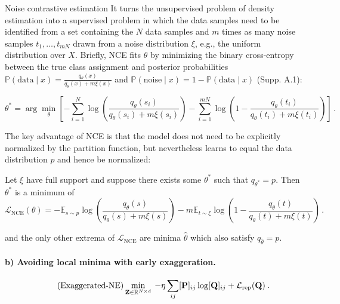 \begin{mem1}{Noise contrastive estimation}
    It turns the unsupervised problem of density estimation into a supervised problem in which the data samples need to be identified from a set containing the $N$ data samples and $m$ times as many noise samples $t_1, \dots, t_{mN}$ drawn from a noise distribution $\xi$, e.g., the uniform distribution over $X$. Briefly, NCE fits $\theta$ by minimizing the binary cross-entropy between the true class assignment and posterior probabilities $\mathbb{P}(\text{data} \mid x) = \frac{q_{\theta}(x)}{q_{\theta}(x) + m\xi(x)}$ and $\mathbb{P}(\text{noise} \mid x) = 1 - \mathbb{P}(\text{data} \mid x)$ (Supp. A.1):

    \begin{equation}
    \theta^* = \arg\min_{\theta} \left[ - \sum_{i=1}^{N} \log \left( \frac{q_{\theta}(s_i)}{q_{\theta}(s_i) + m\xi(s_i)} \right) - \sum_{i=1}^{mN} \log \left( 1 - \frac{q_{\theta}(t_i)}{q_{\theta}(t_i) + m\xi(t_i)} \right) \right] \, . \tag{2}
    \end{equation}
    
    The key advantage of NCE is that the model does not need to be explicitly normalized by the partition function, but nevertheless learns to equal the data distribution $p$ and hence be normalized:
    
    \begin{theorem}
    Let $\xi$ have full support and suppose there exists some $\theta^*$ such that $q_{\theta^*} = p$. Then $\theta^*$ is a minimum of
    \begin{equation}
    \mathcal{L}_{\text{NCE}}(\theta) = - \mathbb{E}_{s \sim p} \log \left( \frac{q_{\theta}(s)}{q_{\theta}(s) + m\xi(s)} \right) - m \mathbb{E}_{t \sim \xi} \log \left( 1 - \frac{q_{\theta}(t)}{q_{\theta}(t) + m\xi(t)} \right) \, . \tag{3}
    \end{equation}

    and the only other extrema of $\mathcal{L}_{\text{NCE}}$ are minima $\hat{\theta}$ which also satisfy $q_{\hat{\theta}} = p$.
    \end{theorem}

\end{mem1}

\paragraph{b) Avoiding local minima with early exaggeration.}

\begin{align}\tag{Exaggerated-NE}\label{eq:exaggerated_ne}
    \min_{{\mathbf{Z}} \in \mathbb{R}^{N \times d}} \: - \eta \sum_{ij} [{\mathbf{P}}]_{ij} \log [{\mathbf{Q}}]_{ij} + \mathcal{L}_{\mathrm{rep}}({\mathbf{Q}}) \:.
\end{align}

